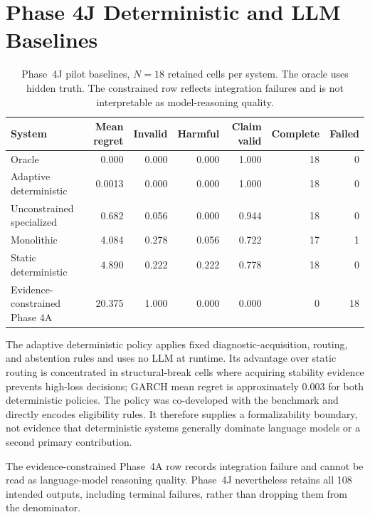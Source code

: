 \section{Phase 4J Deterministic and LLM Baselines}
\label{supp:phase4j}

\begin{table}[t]
\centering
\begin{tabular}{@{}lrrrrrr@{}}
\toprule
System & Mean regret & Invalid & Harmful & Claim valid & Complete & Failed \\
\midrule
Oracle & 0.000 & 0.000 & 0.000 & 1.000 & 18 & 0 \\
Adaptive deterministic & 0.0013 & 0.000 & 0.000 & 1.000 & 18 & 0 \\
Unconstrained specialized & 0.682 & 0.056 & 0.000 & 0.944 & 18 & 0 \\
Monolithic & 4.084 & 0.278 & 0.056 & 0.722 & 17 & 1 \\
Static deterministic & 4.890 & 0.222 & 0.222 & 0.778 & 18 & 0 \\
Evidence-constrained Phase 4A & 20.375 & 1.000 & 0.000 & 0.000 & 0 & 18 \\
\bottomrule
\end{tabular}
\caption{Phase~4J pilot baselines, \(N=18\) retained cells per system.  The
oracle uses hidden truth.  The constrained row reflects integration failures
and is not interpretable as model-reasoning quality.}
\end{table}

The adaptive deterministic policy applies fixed diagnostic-acquisition,
routing, and abstention rules and uses no LLM at runtime.  Its advantage over
static routing is concentrated in structural-break cells where acquiring
stability evidence prevents high-loss decisions; GARCH mean regret is
approximately 0.003 for both deterministic policies.  The policy was
co-developed with the benchmark and directly encodes eligibility rules.  It
therefore supplies a formalizability boundary, not evidence that deterministic
systems generally dominate language models or a second primary contribution.

The evidence-constrained Phase~4A row records integration failure and cannot
be read as language-model reasoning quality.  Phase~4J nevertheless retains
all 108 intended outputs, including terminal failures, rather than dropping
them from the denominator.
